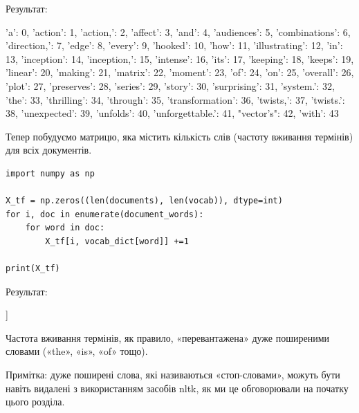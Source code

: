 Результат:

\begin{console}

{'a': 0, 'action': 1, 'action,': 2, 'affect': 3, 'and': 4, 'audiences': 5, 'combinations': 6, 'direction,': 7, 'edge': 8, 'every': 9, 'hooked': 10, 'how': 11, 'illustrating': 12, 'in': 13, 'inception': 14, 'inception,': 15, 'intense': 16, 'its': 17, 'keeping': 18, 'keeps': 19, 'linear': 20, 'making': 21, 'matrix': 22, 'moment': 23, 'of': 24, 'on': 25, 'overall': 26, 'plot': 27, 'preserves': 28, 'series': 29, 'story': 30, 'surprising': 31, 'system.': 32, 'the': 33, 'thrilling': 34, 'through': 35, 'transformation': 36, 'twists,': 37, 'twists.': 38, 'unexpected': 39, 'unfolds': 40, 'unforgettable.': 41, "vector's": 42, 'with': 43}
\end{console}

Тепер побудуємо матрицю, яка містить кількість слів (частоту вживання термінів) для всіх документів.

\begin{lstlisting}
import numpy as np

X_tf = np.zeros((len(documents), len(vocab)), dtype=int)
for i, doc in enumerate(document_words):
    for word in doc:
        X_tf[i, vocab_dict[word]] +=1
        
print(X_tf)
\end{lstlisting}

Результат:

\begin{console}
[[1 0 1 0 1 1 0 0 1 0 0 0 0 1 0 1 1 0 1 0 0 0 0 0 1 1 0 1 0 1 0 0 0 1 1 1
  0 0 1 1 1 0 0 1]
 [0 1 0 0 1 1 0 0 0 1 1 0 0 0 1 0 0 1 0 1 0 1 0 1 1 0 0 0 0 0 1 1 0 1 1 0
  0 1 0 0 0 1 0 1]
 [0 0 0 1 0 0 1 1 0 0 0 1 1 0 0 0 0 0 0 0 1 0 1 0 0 0 1 0 1 0 0 0 1 3 0 0
  1 0 0 0 0 0 1 0]]
\end{console}


Частота вживання термінів, як правило, «перевантажена» дуже поширеними словами («the», «is», «of» тощо). 

 Примітка: дуже поширені слова, які називаються «стоп-словами», можуть бути навіть видалені з використанням засобів nltk, як ми це обговорювали на початку цього розділа.

